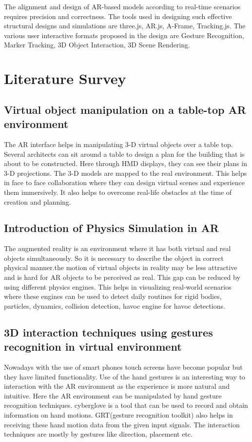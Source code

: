 \documentclass[conference]{IEEEtran}
\begin{document}
The alignment and design of AR-based models according to real-time scenarios requires precision and correctness. The tools used in designing such effective structural designs and simulations are three.js, AR.js, A-Frame, Tracking.js. The various user interactive formats proposed in the design are Gesture Recognition, Marker Tracking, 3D Object Interaction, 3D Scene Rendering.
\section{Literature Survey}
\subsection{Virtual object manipulation on a table-top AR environment}
The AR interface helps in manipulating 3-D virtual objects over a table top\cite{tabletop}. Several architects can sit around a table to design a plan for the building that is about to be constructed. Here through HMD displays, they can see their plans in 3-D projections. The 3-D models are mapped to the real environment. This helps in face to face collaboration where they can design virtual scenes and experience them immersively. It also helps to overcome real-life obstacles at the time of creation and planning. 

\subsection{Introduction of Physics Simulation in AR}
The augmented reality is an environment where it has both virtual and real objects simultaneously. So it is necessary to describe the object in correct physical manner.the motion of virtual objects in reality may be less attractive and is hard for AR objects to be perceived as real. This gap can be reduced by using different physics engines. This helps in visualizing real-world scenarios where these engines can be used to detect daily routines for rigid bodies, particles, dynamics, collision detection, havoc engine for havoc detections\cite{introphysics}.

\subsection{3D interaction techniques using gestures recognition in virtual environment}
Nowadays with the use of smart phones touch screens have become popular but they have limited functionality. Use of the hand gestures is an interesting way to interaction with the AR environment as the experience is more natural and intuitive. Here the AR environment can be manipulated by hand gesture recognition techniques\cite{gestureinteraction}. cyberglove is a tool that can be used to record and obtain information on hand motions. GRT(gesture recognition toolkit) also helps in receiving these hand motion data from the given input signals. The interaction techniques are mostly by gestures like direction, placement etc.
\end{document}
